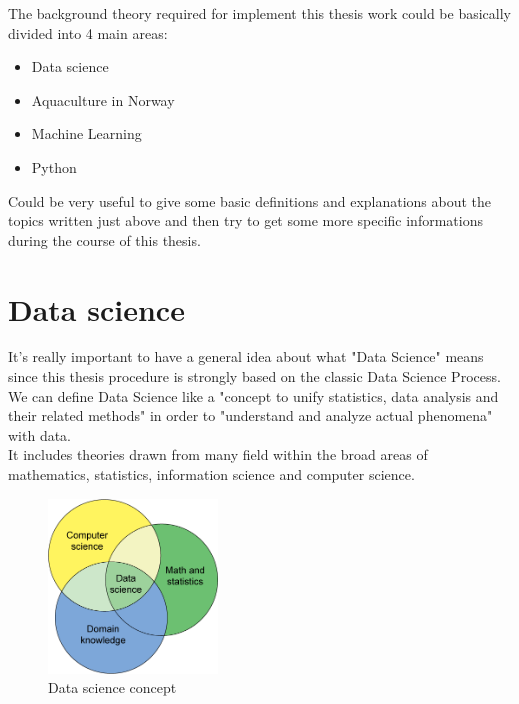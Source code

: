 

The background theory required for implement this thesis work could be basically divided into 4 main areas:
\begin{itemize}
\item Data science
\item Aquaculture in Norway
\item Machine Learning
\item Python
\end{itemize}

Could be very useful to give some basic definitions and explanations about the topics written just above and then try to get some more specific informations during the course of this thesis.

\newpage
\section{Data science}
It's really important to have a general idea about what "Data Science" means since this thesis procedure is strongly based on the classic Data Science Process.\\
We can define Data Science like a "concept to unify statistics, data analysis and their related methods" in order to "understand and analyze actual phenomena" with data.\\
It includes theories drawn from many field within the broad areas of mathematics, statistics, information science and computer science.

\begin{figure}[H]
	\centering
    \includegraphics[width=0.4\textwidth]{Files/Data_Science_Concept.png}
    \caption{Data science concept}
    \label{fig: Data_science}
\end{figure}



